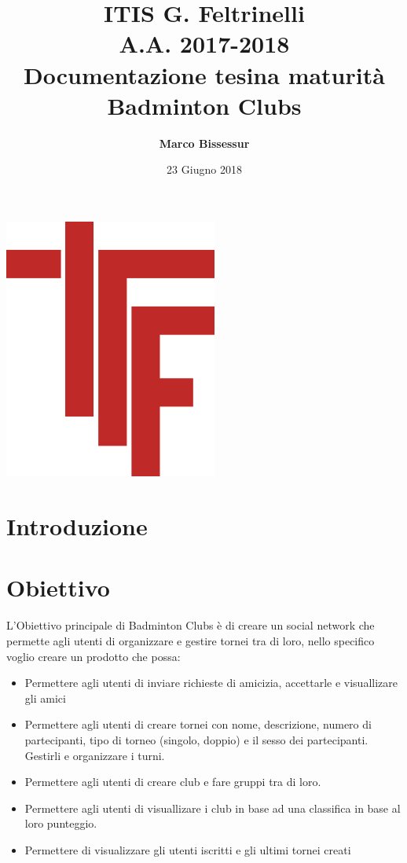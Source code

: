 \documentclass{article}
\author{\textbf{Marco Bissessur}}
\date{23 Giugno 2018}
\title{ITIS G. Feltrinelli
        \\A.A. 2017\@-\@2018
        \\Documentazione tesina maturità \\ \textbf{Badminton Clubs}
      }
\begin{document}
    \maketitle
    \begin{center}
        \includegraphics[width=7cm]{logofeltrinelli}
    \end{center}
    \clearpage
    {\hypersetup{hidelinks}\tableofcontents}
    \clearpage
    
    \section{Introduzione}

    \section{Obiettivo}
L'Obiettivo principale di Badminton Clubs è di creare un social network che permette agli utenti di organizzare e gestire tornei tra di loro, nello specifico voglio creare un prodotto che possa:
\begin{itemize}
    \item Permettere agli utenti di inviare richieste di amicizia, accettarle e visuallizare gli amici
    \item Permettere agli utenti di creare tornei con nome, descrizione, numero di partecipanti, tipo di torneo (singolo, doppio) e il sesso dei partecipanti. Gestirli e organizzare i turni.
    \item Permettere agli utenti di creare club e fare gruppi tra di loro.
    \item Permettere agli utenti  di visuallizare i club in base ad una classifica in base al loro punteggio.
    \item Permettere di visualizzare gli utenti iscritti e gli ultimi tornei creati
\end{itemize}
\end{document}
